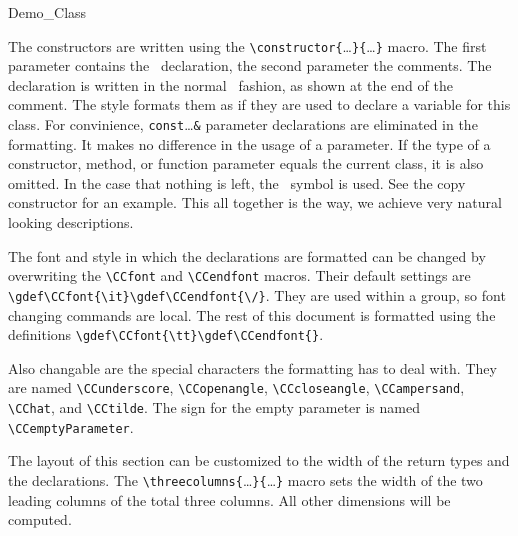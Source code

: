 \begin{class}{Demo_Class}
{The constructors are written using the
\verb"\"\verb"constructor{"\ldots\verb"}{"\ldots\verb"}" macro. The first
parameter contains the \CC\ declaration, the second parameter the comments.
The declaration is written in the normal \CC\ fashion, as shown at the end
of the comment. The style formats them as if they are used
to declare a variable for this class. For convinience,
\verb"const"\ldots\verb"&" parameter declarations are eliminated in the
formatting. It makes no difference in the usage of a parameter. If the
type of a constructor, method, or function parameter equals the
current class, it is also omitted. In the case that nothing is left,
the \CCemptyParameter\ symbol is used. See the copy constructor for an
example. This all together is the way, we achieve very
natural looking descriptions.




The font and style in which the declarations are formatted can be
changed by overwriting the \verb"\CCfont" and \verb"\CCendfont"
macros. Their default settings are
\verb"\gdef\CCfont{\it}\gdef\CCendfont{\/}". They are used within a
group, so font changing commands are local. The rest of this document is
formatted using the definitions \verb"\gdef\CCfont{\tt}\gdef\CCendfont{}".

\gdef\CCfont{\tt}\gdef\CCendfont{}

Also changable are the special characters the formatting has to
deal with. They are named \verb"\CCunderscore", \verb"\CCopenangle",
\verb"\CCcloseangle", \verb"\CCampersand", \verb"\CChat", and
\verb"\CCtilde". The sign for the empty parameter is named
\verb"\CCemptyParameter".

  \operations
  \threecolumns{2.8cm}{2.8cm}

The layout of this section can be customized to the width of the
return types and the declarations. The
\verb"\threecolumns{"\ldots\verb"}{"\ldots\verb"}" macro sets the
width of the two leading columns of the total three columns. All other
dimensions will be computed.

}
\end{class}
